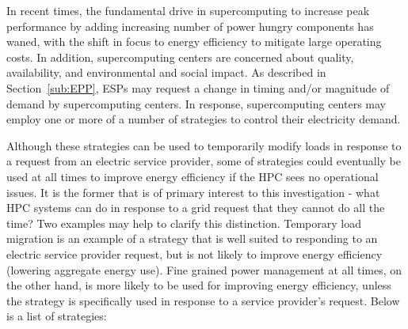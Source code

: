 In recent times, the fundamental drive in supercomputing to increase peak performance by adding 
increasing number of power hungry components has waned, with the shift in focus to energy 
efficiency to mitigate large operating costs.
In addition, supercomputing centers are concerned about quality, availability, and 
environmental and social impact.
As described in Section~\ref{sub:EPP}, ESPs may request 
a change in timing and/or magnitude of demand by supercomputing centers.  
In response, supercomputing centers may employ one or more of a number of strategies to control their 
electricity demand.

Although these strategies can be used to temporarily modify loads in response to a request from an 
electric service provider, some of strategies could eventually be used at all times to improve energy 
efficiency if the HPC sees no operational issues. It is the former that is of primary interest to this 
investigation - what HPC systems can do in response to a grid request that they cannot do all the time? 
Two examples may help to clarify this distinction. Temporary load migration is an example of a strategy 
that is well suited to responding to an electric service provider request, but is not likely to improve 
energy efficiency (lowering aggregate energy use). Fine grained power management at all times, on 
the other hand, is more likely to be used for improving energy efficiency, unless the strategy is 
specifically used in response to a service provider's request. 
Below is a list of strategies:

